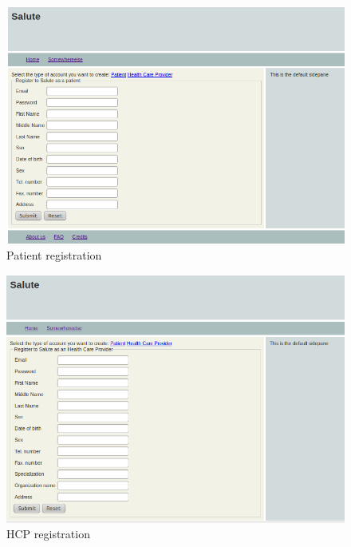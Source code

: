 \begin{figure}
\includegraphics[scale=0.6]{screenshots/pat_register.png}
\caption{Patient registration}
\end{figure}

\begin{figure}
\includegraphics[scale=0.6]{screenshots/HCP_register.png}
\caption{HCP registration}
\end{figure}


